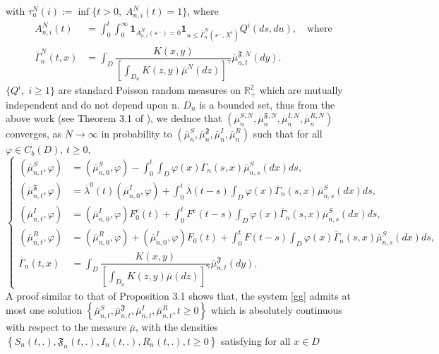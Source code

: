 \documentclass[notitlepage,reqno,11pt]{amsart}
\numberwithin{equation}{section}
\begin{document}
 with $\tau_{n}^N(i):= \inf\{t > 0,\;A_{n,i}^N(t) = 1\}$, where
\begin{align*}
A_{n,i}^N(t)&=	 \int_{0}^{t}\int_{0}^{\infty}\mathbf{1}_{A^N_{n,i}(s^{-}) = 0}\mathbf{1}_{u\leq \overline{\Gamma}_{n}^{N}(s^-,X^i)}Q^{i}(ds,du),\quad \text{where}\\
\overline{\Gamma}_{n}^{N}(t,x)&=\int_{D} \dfrac{K(x,y)}{\left[\displaystyle \int_{D_{n}}K(z,y)\overline{\mu}^{N}(dz) \right]^{\gamma}}\overline{\mu}_{n,t}^{\mathfrak{F},N}(dy).
\end{align*}
$\{Q^{i},\;i \geq 1\}$ are standard Poisson random measures on $\mathbb{R}_{+}^2$ which are mutually independent and do not depend upon n. $D_{n}$ is a bounded set, thus from the above work (see Theorem 3.1 of \cite{AK-EP}), we deduce that $\left(\overline{\mu}_{n}^{S,N},\overline{\mu}_{n}^{\mathfrak{F},N},\overline{\mu}_{n}^{I,N},\overline{\mu}_{n}^{R,N} \right)$ converges, as $N \rightarrow \infty$ in probability to $(\overline{\mu}_{n}^{S}, \overline{\mu}_{n}^{\mathfrak{F}},\overline{\mu}_{n}^{I},\overline{\mu}_{n}^{R})$ such that for all $\varphi \in C_b(D)$, $ t\geq 0,$ 
\begin{equation}
\label{gg}
\left\lbrace
\begin{aligned}
(\overline{\mu}_{n,t}^{S},\varphi)&= (\overline{\mu}_{n,0}^{S},\varphi)- \int_0^t\int_{D}\varphi(x)\overline{\Gamma}_{n}(s,x)\overline{\mu}_{n,s}^{S}(dx)ds,\\
(\overline{\mu}_{n,t}^{\mathfrak{F}},\varphi) &=\overline{\lambda}^0(t)(\overline{\mu}^I_{n,0},\varphi)+\int_0^t\overline{\lambda}(t-s)\int_{D}\varphi(x)\overline{\Gamma}_{n}(s,x)\overline{\mu}_{n,s}^{S}(dx)ds,\\
(\overline{\mu}_{n,t}^{I},\varphi)&= (\overline{\mu}_{n,0}^{I},\varphi)F_0^c(t)+\int_0^tF^c(t-s)\int_{D} \varphi (x)\overline{\Gamma}_{n}(s,x)\overline{\mu}_{n,s}^S(dx)ds,\\
(\overline{\mu}_{n,t}^{R},\varphi)&=(\overline{\mu}_{n,0}^{R},\varphi)+ (\overline{\mu}_{n,0}^{I},\varphi)F_0(t)+\int_0^t F(t-s) \int_{D} \varphi (x)\overline{\Gamma}_{n}(s,x)\overline{\mu}_{n,s}^S(dx)ds,\\
\overline{\Gamma}_{n}(t,x)&=\int_{D} \dfrac{K(x,y)}{\left[\displaystyle\int_{D_{n}}K(z,y)\overline{\mu}(dz) \right]^{\gamma}}\overline{\mu}_{n,t}^{\mathfrak{F}}(dy).
\end{aligned}
\right.
\end{equation}
A proof similar to that of Proposition 3.1  \label{AK-EP} shows that, the system \eqref{gg} admits at most one solution  $\left\{\overline{\mu}^S_{n,t},\overline{\mu}_{n,t}^{\mathfrak{F}},\overline{\mu}_{n,t}^{I},\overline{\mu}_{n,t}^{R}, t \geq 0\right\}$   which is absolutely continuous with respect to the measure $\overline{\mu}$, with the densities $\left\{ S_{n}(t,.),\mathfrak{F}_{n}(t,.),I_{n}(t,.) ,R_{n}(t,.), t\geq 0\right\}$ satisfying for all $x\in D$
\end{document}
